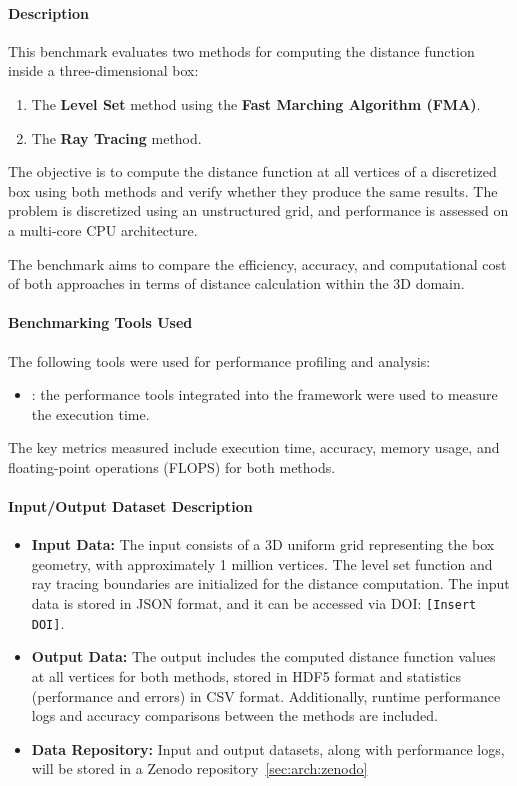 \paragraph{Description}
This benchmark evaluates two methods for computing the distance function inside a three-dimensional box:
\begin{enumerate}
    \item The \textbf{Level Set} method using the \textbf{Fast Marching Algorithm (FMA)}.
    \item The \textbf{Ray Tracing} method.
\end{enumerate}
The objective is to compute the distance function at all vertices of a discretized box using both methods and verify whether they produce the same results.
The problem is discretized using an unstructured grid, and performance is assessed on a multi-core CPU architecture.

The benchmark aims to compare the efficiency, accuracy, and computational cost of both approaches in terms of distance calculation within the 3D domain.

\paragraph{Benchmarking Tools Used}
The following tools were used for performance profiling and analysis:
\begin{itemize}
\item \textbf{\Feelpp}: the performance tools integrated into the \Feelpp framework were used to measure the execution time.
\end{itemize}

The key metrics measured include execution time, accuracy, memory usage, and floating-point operations (FLOPS) for both methods.

\paragraph{Input/Output Dataset Description}
\begin{itemize}
    \item \textbf{Input Data:} The input consists of a 3D uniform grid representing the box geometry, with approximately 1 million vertices. The level set function and ray tracing boundaries are initialized for the distance computation. The input data is stored in JSON format, and it can be accessed via DOI: \texttt{[Insert DOI]}.

    \item \textbf{Output Data:} The output includes the computed distance function values at all vertices for both methods, stored in HDF5 format and statistics (performance and errors) in CSV format. Additionally, runtime performance logs and accuracy comparisons between the methods are included.

    \item \textbf{Data Repository:} Input and output datasets, along with performance logs, will be stored in a Zenodo repository~\cref{sec:arch:zenodo} 
\end{itemize}

